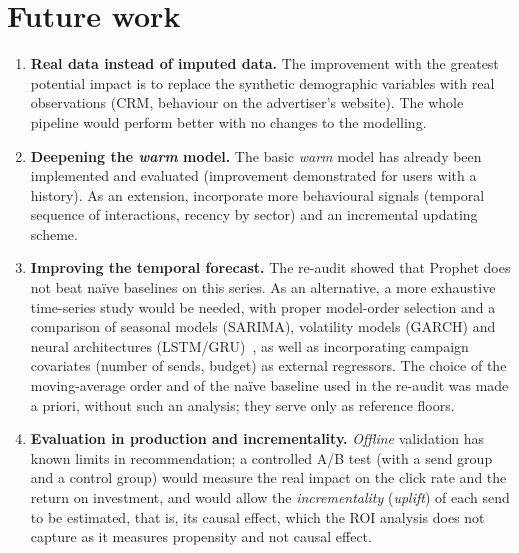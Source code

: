 \section{Future work}

\begin{enumerate}
    \item \textbf{Real data instead of imputed data.} The improvement with the greatest potential impact is to replace the synthetic demographic variables with real observations (CRM, behaviour on the advertiser's website). The whole pipeline would perform better with no changes to the modelling.

    \item \textbf{Deepening the \textit{warm} model.} The basic \emph{warm} model has already been implemented and evaluated (improvement demonstrated for users with a history). As an extension, incorporate more behavioural signals (temporal sequence of interactions, recency by sector) and an incremental updating scheme.

    \item \textbf{Improving the temporal forecast.} The re-audit showed that Prophet does not beat naïve baselines on this series. As an alternative, a more exhaustive time-series study would be needed, with proper model-order selection and a comparison of seasonal models (SARIMA), volatility models (GARCH) and neural architectures (LSTM/GRU)~\cite{gallego2024tfg}, as well as incorporating campaign covariates (number of sends, budget) as external regressors. The choice of the moving-average order and of the naïve baseline used in the re-audit was made a priori, without such an analysis; they serve only as reference floors.

    \item \textbf{Evaluation in production and incrementality.} \textit{Offline} validation has known limits in recommendation; a controlled A/B test (with a send group and a control group) would measure the real impact on the click rate and the return on investment, and would allow the \emph{incrementality} (\textit{uplift}) of each send to be estimated, that is, its causal effect, which the ROI analysis does not capture as it measures propensity and not causal effect.
\end{enumerate}
